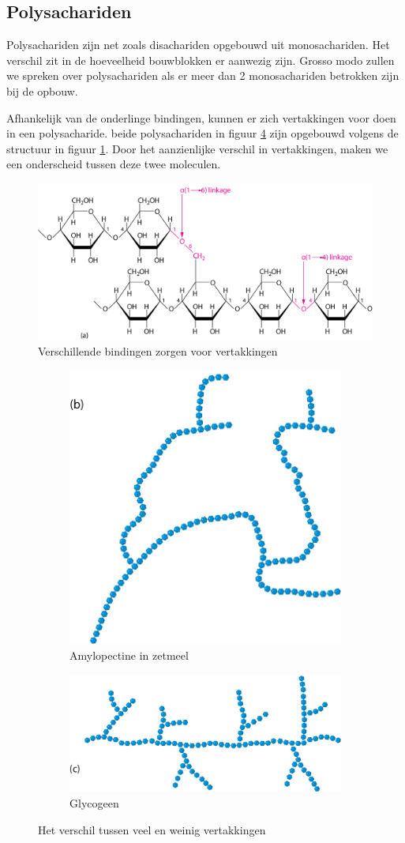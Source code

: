 \documentclass[a4paper,kul]{kulakarticle} %
\begin{document}
\subsection{Polysachariden}
Polysachariden zijn net zoals disachariden opgebouwd uit monosachariden. Het verschil zit in de hoeveelheid bouwblokken er aanwezig zijn. Grosso modo zullen we spreken over polysachariden als er meer dan 2 monosachariden betrokken zijn bij de opbouw.

Afhankelijk van de onderlinge bindingen, kunnen er zich vertakkingen voor doen in een polysacharide. beide polysachariden in figuur \ref{fig:vertakkingen} zijn opgebouwd volgens de structuur in figuur \ref{fig:vertakking}. Door het aanzienlijke verschil in vertakkingen, maken we een onderscheid tussen deze twee moleculen.
\begin{figure}[h]
	\centering
	\includegraphics[width=0.7\linewidth]{Vertakking}
	\caption[Vertakking]{Verschillende bindingen zorgen voor vertakkingen}
	\label{fig:vertakking}
\end{figure}

\begin{figure}[h]
	\centering
	\begin{subfigure}{.5\textwidth}
		\centering
		\includegraphics[width=.4\linewidth]{amylopectine_in_zetmeel.png}
		\caption{Amylopectine in zetmeel}
		\label{fig:sub1}
	\end{subfigure}%
	\begin{subfigure}{.5\textwidth}
		\centering
		\includegraphics[width=.7\linewidth]{Glycogeen.png}
		\caption{Glycogeen}
		\label{fig:sub2}
	\end{subfigure}
	\caption{Het verschil tussen veel en weinig vertakkingen}
	\label{fig:vertakkingen}
\end{figure}
\newpage
\end{document}
